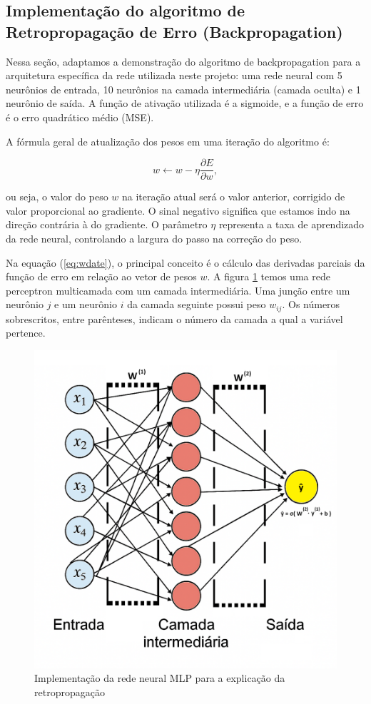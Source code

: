 \documentclass[12pt,a4paper,oneside]{report}
\begin{document}
	\subsection{Implementação do algoritmo de Retropropagação de Erro (Backpropagation)}
	\label{sec:impl_mlp}
	
	Nessa seção, adaptamos a demonstração do algoritmo de backpropagation \cite{leite:2018} para a arquitetura específica da rede utilizada neste projeto: uma rede neural com 5 neurônios de entrada, 10 neurônios na camada intermediária (camada oculta) e 1 neurônio de saída. A função de ativação utilizada é a sigmoide, e a função de erro é o erro quadrático médio (MSE).
	
	A fórmula geral de atualização dos pesos em uma iteração do algoritmo é:
	
	\begin{equation}\label{eq:wdate}
		w \leftarrow w - \eta \frac{\partial E}{\partial w},
	\end{equation}
	
	ou seja, o valor do peso $w$ na iteração atual será o valor anterior, corrigido de valor proporcional ao gradiente. O sinal negativo significa que estamos indo na direção contrária à do gradiente. O parâmetro $\eta$ representa a taxa de aprendizado da rede neural, controlando a largura do passo na correção do peso. 
	
	Na equação (\ref{eq:wdate}), o principal conceito é o cálculo das derivadas parciais da função de erro em relação ao vetor de pesos $w$. A figura \ref{fig:mlp_backprop_diagram} temos uma rede perceptron multicamada com um camada intermediária. Uma junção entre um neurônio $j$ e um neurônio $i$ da camada seguinte possui peso $w_{ij}$. Os números sobrescritos, entre parênteses, indicam o número da camada a qual a variável pertence.
	
	\begin{figure}[h]
		\centering
		\includegraphics[width=0.6\linewidth]{img/mlp_backprop_diagram}
		\caption[Implementação do Multi-Layer Perceptron]{ Implementação da rede neural MLP para a explicação da retropropagação}
		\label{fig:mlp_backprop_diagram}
	\end{figure}
\end{document}
